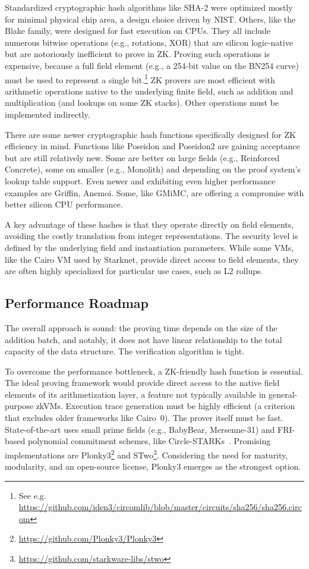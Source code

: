 \documentclass[twocolumn]{article}
\begin{document}
Standardized cryptographic hash algorithms like SHA-2 were optimized mostly for minimal physical chip area, a design choice driven by NIST. Others, like the Blake family, were designed for fast execution on CPUs. They all include numerous bitwise operations (e.g., rotations, XOR) that are silicon logic-native but are notoriously inefficient to prove in ZK. Proving such operations is expensive, because a full field element (e.g., a 254-bit value on the BN254 curve) must be used to represent a single bit.\footnote{See e.g. \url{https://github.com/iden3/circomlib/blob/master/circuits/sha256/sha256.circom}} ZK provers are most efficient with arithmetic operations native to the underlying finite field, such as addition and multiplication (and lookups on some ZK stacks). Other operations must be implemented indirectly.

There are some newer cryptographic hash functions specifically designed for ZK efficiency in mind. Functions like Poseidon and Poseidon2 are gaining acceptance but are still relatively new. Some are better on large fields (e.g., Reinforced Concrete), some on smaller (e.g., Monolith) and depending on the proof system's lookup table support. Even newer and exhibiting even higher performance examples are Griffin, Anemoi. Some, like GMiMC, are offering a compromise with better silicon CPU performance.

A key advantage of these hashes is that they operate directly on field elements, avoiding the costly translation from integer representations. The security level is defined by the underlying field and instantiation parameters. While some VMs, like the Cairo VM used by Starknet, provide direct access to field elements, they are often highly specialized for particular use cases, such as L2 rollups.


\subsection{Performance Roadmap}

The overall approach is sound: the proving time depends on the size of the addition batch, and notably, it does not have linear relationship to the total capacity of the data structure. The verification algorithm is tight.

To overcome the performance bottleneck, a ZK-friendly hash function is essential. The ideal proving framework would provide direct access to the native field elements of its arithmetization layer, a feature not typically available in general-purpose zkVMs. Execution trace generation must be highly efficient (a criterion that excludes older frameworks like Cairo~0). The prover itself must be fast. State-of-the-art uses small prime fields (e.g., BabyBear, Mersenne-31) and FRI-based polynomial commitment schemes, like Circle-STARKs~\cite{cryptoeprint:2024/278}. Promising implementations are Plonky3\footnote{\url{https://github.com/Plonky3/Plonky3}} and STwo\footnote{\url{https://github.com/starkware-libs/stwo}}. Considering the need for maturity, modularity, and an open-source license, Plonky3 emerges as the strongest option.
\end{document}
